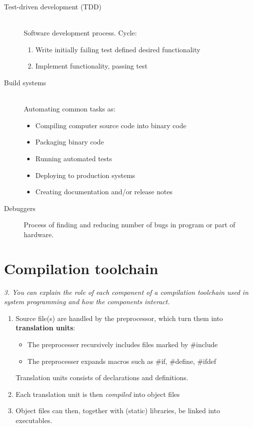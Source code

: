 \documentclass{article}
\begin{document}
\begin{description}
\item[Test-driven development (TDD)] \ \\
Software development process. Cycle:
\begin{enumerate}
\item Write initially failing test defined desired functionality
\item Implement functionality, passing test
\end{enumerate}

\item[Build systems] \ \\
Automating common tasks as:
\begin{itemize}
\item Compiling computer source code into binary code
\item Packaging binary code
\item Running automated tests
\item Deploying to production systems
\item Creating documentation and/or release notes
\end{itemize}

\item[Debuggers] Process of finding and reducing number of bugs in program or part of hardware.
\end{description}


\section{Compilation toolchain}
\emph{3. You can explain the role of each component of a compilation toolchain used in system programming and how the components interact.}

\begin{enumerate}
	\item Source file(s) are handled by the preprocessor, which turn them into \textbf{translation units}:
	\begin{itemize}
		\item The preprocesser recursively includes files marked by \#include
		\item The preprocesser expands macros such as \#if, \#define, \#ifdef
	\end{itemize}
	Translation units consists of declarations and definitions.
	\item Each translation unit is then \emph{compiled} into object files
	\item Object files can then, together with (static) libraries, be linked into executables.
\end{enumerate}
\end{document}
